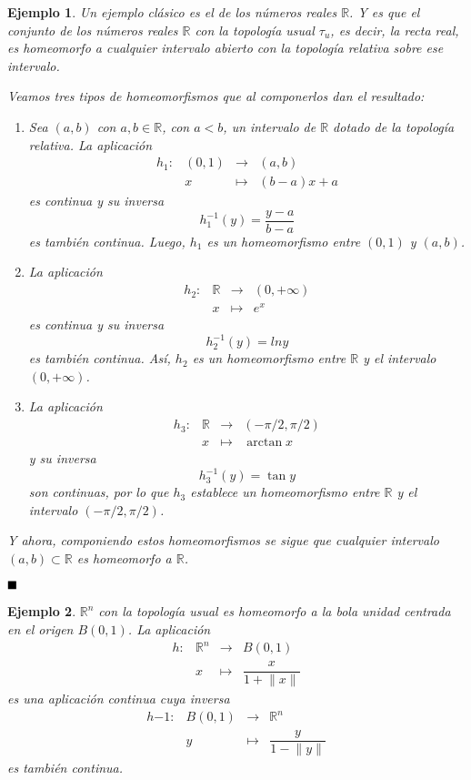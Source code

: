 \documentclass[12pt]{article}
\newtheorem{example}{Ejemplo}[theorem]
\providecommand{\norm}[1]{\lVert#1\rVert}
\begin{document}
\begin{example}Un ejemplo clásico es el de los números reales $\mathbb{R}$. Y es que el conjunto de los números reales $\mathbb{R}$ con la topología usual $\tau_u$, es decir, la recta real, es homeomorfo a cualquier intervalo abierto con la topología relativa sobre ese intervalo. 

Veamos tres tipos de homeomorfismos que al componerlos dan el resultado: 
\begin{enumerate}
\item Sea $(a,b)$ con $a,b \in \mathbb{R}$, con $a <b$, un intervalo de $\mathbb{R}$ dotado de la topología relativa. La aplicación  $$
\begin{array}{rccl}
h_1\colon &(0, 1)& \longrightarrow & (a, b)\\
&x& \longmapsto &(b-a)x+a
\end{array}
$$ es continua y su inversa $$h_1^{-1}(y) = \dfrac{y-a}{b-a}$$ es también continua. Luego, $h_1$ es un homeomorfismo entre $(0,1)$ y $(a,b)$.
\item La aplicación $$
\begin{array}{rccl}
h_2\colon &\mathbb{R}& \longrightarrow & (0, + \infty)\\
&x& \longmapsto &e^x
\end{array}
$$ es continua y su inversa $$h_2^{-1}(y) = ln y$$ es también continua. Así, $h_2$ es un homeomorfismo entre $\mathbb{R}$ y el intervalo $(0, + \infty)$.
\item La aplicación $$
\begin{array}{rccl}
h_3\colon &\mathbb{R}& \longrightarrow & (-\pi/2, \pi/2)\\
&x& \longmapsto &\arctan x
\end{array}
$$ y su inversa $$h_3^{-1}(y) = \tan y$$ son continuas, por lo que $h_3$ establece un homeomorfismo entre $\mathbb{R}$ y el intervalo $(-\pi/2,\pi/2)$.
\end{enumerate}
Y ahora, componiendo estos homeomorfismos se sigue que cualquier intervalo $(a,b) \subset \mathbb{R}$ es homeomorfo a $\mathbb{R}$.
\end{example}

$\hfill \blacksquare$

\begin{example}$\mathbb{R}^n$ con la topología usual es homeomorfo a la bola unidad  centrada en el origen $B(0,1)$. La aplicación  $$
\begin{array}{rccl}
h\colon &\mathbb{R}^n& \longrightarrow & B(0, 1)\\
&x& \longmapsto &\dfrac{x}{1+\norm{x}}
\end{array}
$$ es una aplicación continua cuya inversa  $$
\begin{array}{rccl}
h{-1}\colon &B(0, 1)& \longrightarrow & \mathbb{R}^n\\
&y& \longmapsto &\dfrac{y}{1-\norm{y}}
\end{array}
$$ es también continua.
\end{example}
\end{document}

